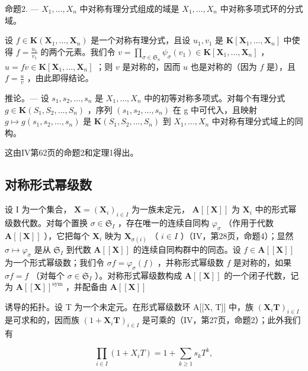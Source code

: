 命题2. --- \(X_{1}, \ldots, X_{n}\) 中对称有理分式组成的域是 \(X_{1}, \ldots, X_{n}\) 中对称多项式环的分式域。

设 \(f \in \mathbf{K}(\mathbf{X}_1, \ldots, \mathbf{X}_n)\) 是一个对称有理分式，且设 \(u_1, v_1\) 是 \(\mathbf{K}[\mathbf{X}_1, \ldots, \mathbf{X}_n]\) 中使得 \(f = \frac{u_1}{v_1}\) 的两个元素。我们令 \(v = \prod_{\sigma \in \mathfrak{S}_n} \psi_\sigma(v_1) \in \mathbf{K}[\mathbf{X}_1, \ldots, \mathbf{X}_n]\) ， \(u = fv \in \mathbf{K}[\mathbf{X}_1, \ldots, \mathbf{X}_n]\) ；则 \(v\) 是对称的，因而 \(u\) 也是对称的（因为 \(f\) 是），且 \(f = \frac{u}{v}\) ，由此即得结论。

推论。--- 设 \(s_{1}, s_{2}, \ldots, s_{n}\) 是 \(X_{1}, \ldots, X_{n}\) 中的初等对称多项式。对每个有理分式 \(g \in \mathbf{K}(S_{1}, S_{2}, \ldots, S_{n})\) ，序列 \((s_{1}, s_{2}, \ldots, s_{n})\) 在 g 中可代入，且映射 \(g \mapsto g(s_{1}, s_{2}, \ldots, s_{n})\) 是 \(\mathbf{K}(S_{1}, S_{2}, \ldots, S_{n})\) 到 \(X_{1}, \ldots, X_{n}\) 中对称有理分式域上的同构。

这由IV第62页的命题2和定理1得出。

\subsection{对称形式幂级数}

设 I 为一个集合， \(\mathbf{X} = (\mathbf{X}_i)_{i\in I}\) 为一族未定元， \(\mathbf{A}[[\mathbf{X}]]\) 为 \(\mathbf{X}_i\) 中的形式幂级数代数。对每个置换 \(\sigma \in \mathfrak{S}_I\) ，存在唯一的连续自同构 \(\varphi_{\sigma}\) （作用于代数 \(\mathbf{A}[[\mathbf{X}]]\) ），它把每个 \(\mathbf{X}_i\) 映为 \(\mathbf{X}_{\sigma (i)}\) （ \(i\in I\) ）（IV，第28页，命题4）；显然 \(\sigma \mapsto \varphi_{\sigma}\) 是从 \(\mathfrak{S}_I\) 到代数 \(\mathbf{A}[[\mathbf{X}]]\) 的连续自同构群中的同态。设 \(f\in \mathbf{A}[[\mathbf{X}]]\) 为一个形式幂级数；我们令 \(\sigma f = \varphi_{\sigma}(f)\) ，并称形式幂级数 \(f\) 是对称的，如果 \(\sigma f = f\) （对每个 \(\sigma \in \mathfrak{S}_I\) ）。对称形式幂级数构成 \(\mathbf{A}[[\mathbf{X}]]\) 的一个闭子代数，记为 \(\mathbf{A}[[\mathbf{X}]]^{\mathrm{sym}}\) ，并配备由 \(\mathbf{A}[[\mathbf{X}]]\)

诱导的拓扑。设 T 为一个未定元。在形式幂级数环 A{[}{[}X, T{]}{]} 中，族 \((\mathbf{X}_i\mathbf{T})_{i\in I}\) 是可求和的，因而族 \((1 + \mathbf{X}_i\mathbf{T})_{i\in I}\) 是可乘的（IV，第27页，命题2）；此外我们有

\[
\prod_ {i \in I} (1 + X _ {i} T) = 1 + \sum_ {k \geqslant 1} s _ {k} T ^ {k},\tag{14}
\]

